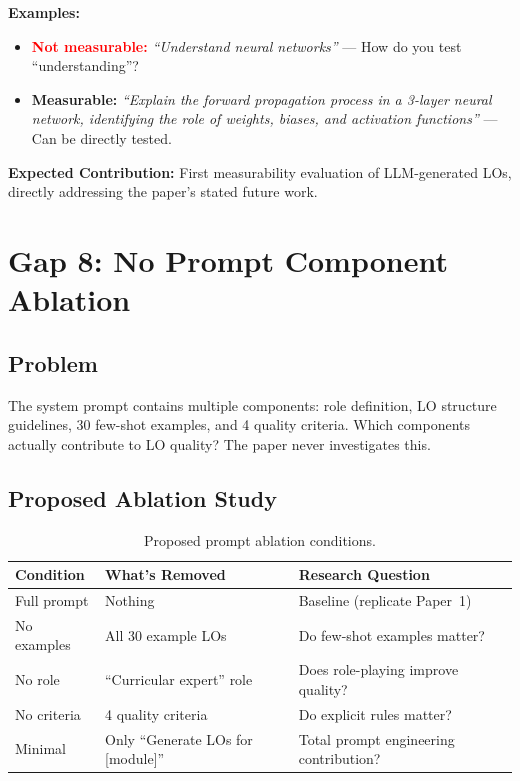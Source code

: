 \documentclass[11pt,a4paper]{article}
\begin{document}
\textbf{Examples:}
\begin{itemize}[nosep]
    \item \textcolor{red}{\textbf{Not measurable:}} \textit{``Understand neural networks''} --- How do you test ``understanding''?
    \item \textcolor{greenBorder}{\textbf{Measurable:}} \textit{``Explain the forward propagation process in a 3-layer neural network, identifying the role of weights, biases, and activation functions''} --- Can be directly tested.
\end{itemize}

\begin{notebox}
\textbf{Expected Contribution:} First measurability evaluation of LLM-generated LOs, directly addressing the paper's stated future work.
\end{notebox}

\section{Gap 8: No Prompt Component Ablation}

\subsection{Problem}
The system prompt contains multiple components: role definition, LO structure guidelines, 30 few-shot examples, and 4 quality criteria. Which components actually contribute to LO quality? The paper never investigates this.

\subsection{Proposed Ablation Study}

\begin{table}[H]
\centering
\caption{Proposed prompt ablation conditions.}
\label{tab:ablation}
\begin{tabular}{@{}llp{5cm}@{}}
\toprule
\textbf{Condition} & \textbf{What's Removed} & \textbf{Research Question} \\
\midrule
Full prompt & Nothing & Baseline (replicate Paper~1) \\
No examples & All 30 example LOs & Do few-shot examples matter? \\
No role & ``Curricular expert'' role & Does role-playing improve quality? \\
No criteria & 4 quality criteria & Do explicit rules matter? \\
Minimal & Only ``Generate LOs for [module]'' & Total prompt engineering contribution? \\
\bottomrule
\end{tabular}
\end{table}
\end{document}
